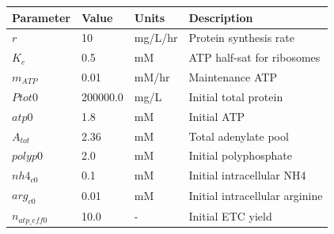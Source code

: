 \documentclass{article}
\begin{document}
\begin{tabular}{@{}llll@{}}
\toprule
Parameter & Value & Units & Description \\
\midrule
$r$ & 10 & mg/L/hr & Protein synthesis rate \\
$K_e$ & 0.5 & mM & ATP half-sat for ribosomes \\
$m_{ATP}$ & 0.01 & mM/hr & Maintenance ATP \\
$Ptot0$ & 200000.0 & mg/L & Initial total protein \\
$atp0$ & 1.8 & mM & Initial ATP \\
$A_{tot}$ & 2.36 & mM & Total adenylate pool \\
$polyp0$ & 2.0 & mM & Initial polyphosphate \\
$nh4_{c0}$ & 0.1 & mM & Initial intracellular NH4 \\
$arg_{c0}$ & 0.01 & mM & Initial intracellular arginine \\
$n_{atp\_eff0}$ & 10.0 & - & Initial ETC yield \\
\bottomrule
\end{tabular}
\end{document}
